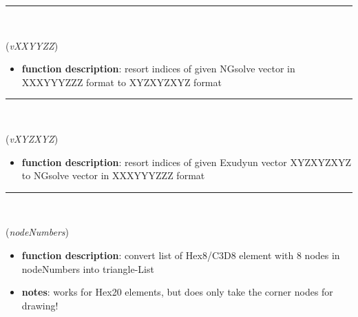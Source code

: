\begin{itemize}[leftmargin=1.4cm]
\begin{itemize}[leftmargin=1.4cm]
\begin{itemize}[leftmargin=1.4cm]
\begin{itemize}[leftmargin=0.5cm]
\begin{itemize}[leftmargin=1.4cm]
\begin{itemize}[leftmargin=1.4cm]
\begin{itemize}[leftmargin=1.4cm]
\begin{itemize}[leftmargin=0.5cm]
\begin{itemize}[leftmargin=0.7cm]
\begin{itemize}[leftmargin=1.2cm]
\end{itemize}
\vspace{12pt}\end{itemize}
%
\noindent\rule{8cm}{0.75pt}\vspace{1pt} \\ 
\begin{flushleft}
\label{sec:FEM:ResortIndicesOfNGvector}
({\it vXXYYZZ})
\end{flushleft}
\setlength{\itemindent}{0.7cm}
\begin{itemize}[leftmargin=0.7cm]
\item[--]
{\bf function description}: resort indices of given NGsolve vector in XXXYYYZZZ format to XYZXYZXYZ format
\vspace{12pt}\end{itemize}
%
\noindent\rule{8cm}{0.75pt}\vspace{1pt} \\ 
\begin{flushleft}
\label{sec:FEM:ResortIndicesExudyn2NGvector}
({\it vXYZXYZ})
\end{flushleft}
\setlength{\itemindent}{0.7cm}
\begin{itemize}[leftmargin=0.7cm]
\item[--]
{\bf function description}: resort indices of given Exudyun vector XYZXYZXYZ to NGsolve vector in XXXYYYZZZ format
\vspace{12pt}\end{itemize}
%
\noindent\rule{8cm}{0.75pt}\vspace{1pt} \\ 
\begin{flushleft}
\label{sec:FEM:ConvertHexToTrigs}
({\it nodeNumbers})
\end{flushleft}
\setlength{\itemindent}{0.7cm}
\begin{itemize}[leftmargin=0.7cm]
\item[--]
{\bf function description}: convert list of Hex8/C3D8  element with 8 nodes in nodeNumbers into triangle-List
\item[--]
{\bf notes}: works for Hex20 elements, but does only take the corner nodes for drawing!
\vspace{12pt}\end{itemize}

\end{itemize}
\end{itemize}
\end{itemize}
\end{itemize}
\end{itemize}
\end{itemize}
\end{itemize}
\end{itemize}
